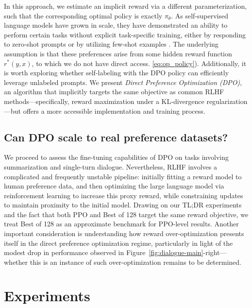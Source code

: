In this approach, we estimate an implicit reward via a different parameterization, such that the corresponding optimal policy is exactly $\pi_\theta$. As self-supervised language models have grown in scale, they have demonstrated an ability to perform certain tasks without explicit task-specific training, either by responding to zero-shot prompts \citep{radford2019language} or by utilizing few-shot examples \citep{gpt3,megatron,chowdhery2022palm}. The underlying assumption is that these preferences arise from some hidden reward function $r^*(y, x)$, to which we do not have direct access. \ref{eq:op_policy}). Additionally, it is worth exploring whether self-labeling with the DPO policy can efficiently leverage unlabeled prompts. We present \textit{{Direct Preference Optimization} (DPO)}, an algorithm that implicitly targets the same objective as common RLHF methods—specifically, reward maximization under a KL-divergence regularization—but offers a more accessible implementation and training process. \subsection{Can DPO scale to real preference datasets?}
\label{sec:dpo-real-datasets}
We proceed to assess the fine-tuning capabilities of DPO on tasks involving summarization and single-turn dialogue. Nevertheless, RLHF involves a complicated and frequently unstable pipeline: initially fitting a reward model to human preference data, and then optimizing the large language model via reinforcement learning to increase this proxy reward, while constraining updates to maintain proximity to the initial model. Drawing on our TL;DR experiments and the fact that both PPO and Best of 128 target the same reward objective, we treat Best of 128 as an approximate benchmark for PPO-level results. Another important consideration is understanding how reward over-optimization presents itself in the direct preference optimization regime, particularly in light of the modest drop in performance observed in Figure~\ref{fig:dialogue-main}-right—whether this is an instance of such over-optimization remains to be determined. \section{Experiments}
